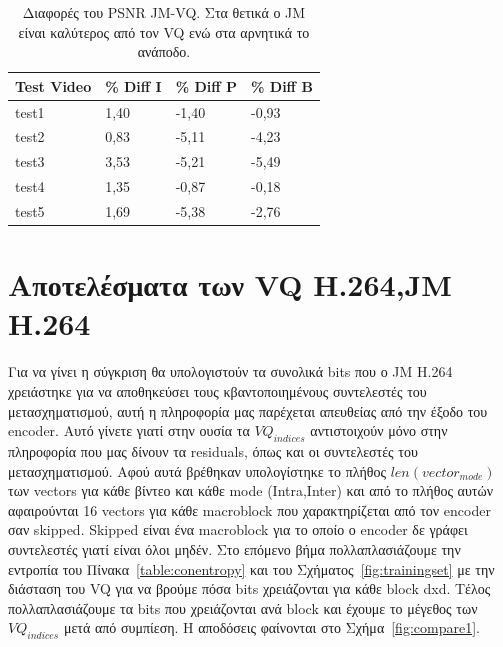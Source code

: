 \begin{table}[h!]
    \begin{center}
        \begin{tabular}{| l | l | l | l |}
        \hline
        Test Video & \% Diff I  & \% Diff P & \% Diff B   \\ \hline
        test1      & 1,40	    & -1,40	    & -0,93       \\ \hline
        test2      & 0,83	    & -5,11	    & -4,23       \\ \hline
        test3      & 3,53	    & -5,21	    & -5,49       \\ \hline
        test4      & 1,35	    & -0,87	    & -0,18       \\ \hline
        test5      & 1,69	    & -5,38	    & -2,76       \\ \hline
        \hline
        \end{tabular}
    \end{center}

    \caption{Διαφορές του PSNR JM-VQ. Στα θετικά ο JM είναι καλύτερος από τον VQ ενώ στα αρνητικά το ανάποδο.}
    \label{table:jmvqdiff}
\end{table}

\newpage
\section{Αποτελέσματα των VQ H.264,JM H.264}
\label{section:sect63}

\indent Για να γίνει η σύγκριση θα υπολογιστούν τα συνολικά bits που ο JM H.264 χρειάστηκε για να αποθηκεύσει τους κβαντοποιημένους συντελεστές του μετασχηματισμού, αυτή η πληροφορία μας παρέχεται απευθείας από την έξοδο του encoder. Αυτό γίνετε γιατί στην ουσία τα $VQ_{indices}$ αντιστοιχούν μόνο στην πληροφορία που μας δίνουν τα residuals, όπως και οι συντελεστές του μετασχηματισμού. Αφού αυτά βρέθηκαν υπολογίστηκε το πλήθος $len(vector_{mode})$ των vectors για κάθε βίντεο και κάθε mode (Intra,Inter) και από το πλήθος αυτών αφαιρούνται 16 vectors για κάθε macroblock που χαρακτηρίζεται από τον encoder σαν skipped. Skipped είναι ένα macroblock για το οποίο ο encoder δε γράφει συντελεστές γιατί είναι όλοι μηδέν. Στο επόμενο βήμα πολλαπλασιάζουμε την εντροπία του Πίνακα~\ref{table:conentropy} και του Σχήματος~\ref{fig:trainingset} με την διάσταση του VQ για να βρούμε πόσα bits χρειάζονται για κάθε block dxd. Τέλος πολλαπλασιάζουμε τα bits που χρειάζονται ανά block και έχουμε το μέγεθος των $VQ_{indices}$ μετά από συμπίεση. Η αποδόσεις φαίνονται στο Σχήμα~\ref{fig:compare1}.


